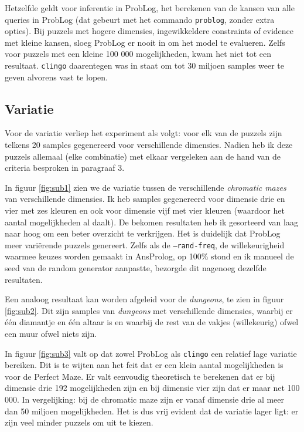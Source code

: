 \documentclass{article}
\begin{document}
Hetzelfde geldt voor inferentie in ProbLog, het berekenen van de kansen van alle queries in ProbLog (dat gebeurt met het commando \texttt{problog}, zonder extra opties). Bij puzzels met hogere dimensies, ingewikkeldere constraints of  evidence met kleine kansen, sloeg ProbLog er nooit in om het model te evalueren. Zelfs voor puzzels met een kleine 100 000 mogelijkheden, kwam het niet tot een resultaat. \texttt{clingo} daarentegen was in staat om tot 30 miljoen samples weer te geven alvorens vast te lopen.
	
	\subsection{Variatie}
	
	Voor de variatie verliep het experiment als volgt: voor elk van de puzzels zijn telkens 20 samples gegenereerd voor verschillende dimensies. Nadien heb ik deze puzzels allemaal  (elke combinatie) met elkaar vergeleken aan de hand van de criteria besproken in paragraaf 3.
	
	In figuur \ref{fig:sub1} zien we de variatie tussen de verschillende \textit{chromatic mazes} van verschillende dimensies. Ik heb samples gegenereerd voor dimensie drie en vier met zes kleuren en ook voor dimensie vijf met vier kleuren (waardoor het aantal mogelijkheden al daalt). De bekomen resultaten heb ik gesorteerd van laag naar hoog om een beter overzicht te verkrijgen. Het is duidelijk dat ProbLog meer vari\"erende puzzels genereert. Zelfs als de \texttt{--rand-freq}, de willekeurigheid waarmee keuzes worden gemaakt in AnsProlog, op 100\% stond en ik manueel de seed van de random generator aanpastte, bezorgde dit nagenoeg dezelfde resultaten.	
	
	Een analoog resultaat kan worden afgeleid voor de \textit{dungeons}, te zien in figuur \ref{fig:sub2}. Dit zijn samples van \textit{dungeons} met verschillende dimensies, waarbij er \'e\'en diamantje en \'e\'en altaar is  en waarbij de rest van de vakjes (willekeurig) ofwel een muur ofwel niets zijn. 
	
	In figuur \ref{fig:sub3} valt op dat zowel ProbLog als \texttt{clingo} een relatief lage variatie bereiken. Dit is te wijten aan het feit dat er een klein aantal mogelijkheden is voor de Perfect Maze. Er valt eenvoudig theoretisch te berekenen dat er bij dimensie drie 192 mogelijkheden zijn en bij dimensie vier zijn dat er maar net 100 000. In vergelijking: bij de chromatic maze zijn er vanaf dimensie drie al meer dan 50 miljoen mogelijkheden. Het is dus vrij evident dat de variatie lager ligt: er zijn veel minder puzzels om uit te kiezen.
	
\end{document}
